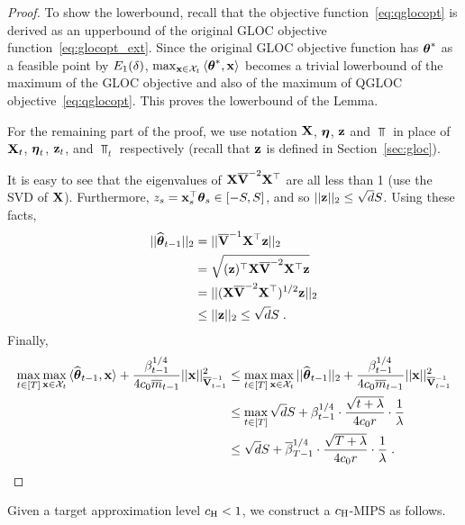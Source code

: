 \begin{proof}
  To show the lowerbound, recall that the objective function~\eqref{eq:qglocopt} is derived as an upperbound of the original GLOC objective function~\eqref{eq:glocopt_ext}.
  Since the original GLOC objective function has ${{\boldsymbol \theta}}^*$ as a feasible point by $E_1({\delta})$, $\max_{\mathbf{x}\in\mathcal{X}_t} {\langle} {{\boldsymbol \theta}}^*,\mathbf{x}{\rangle}$ becomes a trivial lowerbound of the maximum of the GLOC objective and also of the maximum of QGLOC objective~\eqref{eq:qglocopt}.
  This proves the lowerbound of the Lemma.

  For the remaining part of the proof, we use notation $\mathbf{X}$, ${{\boldsymbol \eta}}$, ${{\mathbf z}}$ and $\barV$ in place of $\mathbf{X}_t$, ${{\boldsymbol \eta}}_t$, ${{\mathbf z}}_t$, and $\barV_t$ respectively (recall that ${{\mathbf z}}$ is defined in Section~\ref{sec:gloc}).

  It is easy to see that the eigenvalues of $\mathbf{X}\overline{\mathbf{V}}^{-2}\mathbf{X}^{\top}$ are all less than 1 (use the SVD of $\mathbf{X}$).
  Furthermore, $z_s = \mathbf{x}_s^{\top}{{\boldsymbol \theta}}_s \in [-S,S]$, and so $||{{\mathbf z}}||_2 \le \sqrt{d} S$.
  Using these facts, 
  \begin{equation*}\begin{aligned}
    ||{{\widehat{\boldsymbol \theta}}}_{t-1}||_2 
    &= || \overline{\mathbf{V}}^{-1} \mathbf{X}^{\top} {{\mathbf z}}||_2
  \\&= \sqrt{({{\mathbf z}})^{\top} \mathbf{X} \overline{\mathbf{V}}^{-2} \mathbf{X}^{\top} {{\mathbf z}}}
  \\&= ||(\mathbf{X}\overline{\mathbf{V}}^{-2}\mathbf{X}^{\top})^{1/2}  {{\mathbf z}} ||_2
  \\&\le ||{{\mathbf z}}||_2
     \le \sqrt{d}S \;.
  \end{aligned}\end{equation*}
  Finally, %
  \begin{equation*}\begin{aligned}
  \max_{t\in[T]} \max_{\mathbf{x}\in\mathcal{X}_t} {\langle}\widehat{\boldsymbol\theta}_{t-1}, \mathbf{x}{\rangle} + { \frac{\beta_{t-1}^{1/4}}{4 c_0 \overline{m}_{t-1}} } ||\mathbf{x}||^2_{\overline{\mathbf{V}}^{-1}_{t-1}} 
    &\le \max_{t\in[T]} \max_{\mathbf{x}\in\mathcal{X}_t} ||\widehat{\boldsymbol\theta}_{t-1}||_2 + { \frac{\beta_{t-1}^{1/4}}{4 c_0 \overline{m}_{t-1}} } ||\mathbf{x}||^2_{\overline{\mathbf{V}}^{-1}_{t-1}}
  \\&\le \max_{t\in[T]} \sqrt{d}S
     + \beta_{t-1}^{1/4} \cdot { \frac{\sqrt{t + \lambda}}{ 4 c_0 r} } \cdot { \frac{1}{\lambda} } 
  \\&\le \sqrt{d} S + {\overline{\beta}}_{T-1}^{1/4} \cdot { \frac{\sqrt{T + \lambda}}{ 4 c_0 r } } \cdot { \frac{1}{\lambda} }  \;.
  \end{aligned}\end{equation*}
\end{proof}
%
Given a target approximation level $c_\text{\normalfont H} < 1$, we construct a $c_\text{\normalfont H}$-MIPS as follows.
